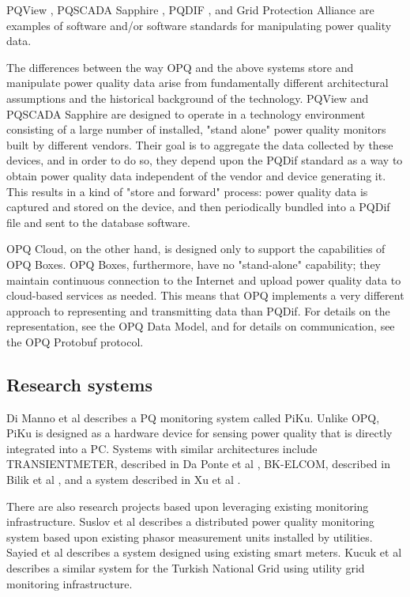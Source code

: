 PQView \cite{electrotek_concepts_pqview_2020},  PQSCADA Sapphire \cite{elspec_ltd_pqscada_2016}, PQDIF \cite{sabin_ieee_2020}, and Grid Protection Alliance \cite{grid_protection_alliance_grid_2020}  are examples of software and/or software standards for manipulating power quality data.

The differences between the way OPQ and the above systems store and manipulate power quality data arise from fundamentally different architectural assumptions and the historical background of the technology. PQView and PQSCADA Sapphire are designed to operate in a technology environment consisting of a large number of installed, "stand alone" power quality monitors built by different vendors. Their goal is to aggregate the data collected by these devices, and in order to do so, they depend upon the PQDif standard as a way to obtain power quality data independent of the vendor and device generating it. This results in a kind of "store and forward" process: power quality data is captured and stored on the device, and then periodically bundled into a PQDif file and sent to the database software.

OPQ Cloud, on the other hand, is designed only to support the capabilities of OPQ Boxes. OPQ Boxes, furthermore, have no "stand-alone" capability; they maintain continuous connection to the Internet and upload power quality data to cloud-based services as needed. This means that OPQ implements a very different approach to representing and transmitting data than PQDif. For details on the representation, see the OPQ Data Model, and for details on communication, see the OPQ Protobuf protocol.

\subsection{Research systems}

Di Manno et al \cite{di_manno_user_2015} describes a PQ monitoring system called PiKu. Unlike OPQ, PiKu is designed as a hardware device for sensing power quality that is directly integrated into a PC. Systems with similar architectures include TRANSIENTMETER, described in Da Ponte et al \cite{daponte_transientmeter:_2000}, BK-ELCOM, described in Bilik et al \cite{bilik_modular_2007}, and a system described in Xu et al \cite{xu_distributed_2012}.

There are also research projects based upon leveraging existing monitoring infrastructure. Suslov et al \cite{suslov_distributed_2014} describes a distributed power quality monitoring system based upon existing phasor measurement units installed by utilities. Sayied et al \cite{sayied_power_2013} describes a system designed using existing smart meters. Kucuk et al \cite{kucuk_extensible_2010} describes a similar system for the Turkish National Grid using utility grid monitoring infrastructure.

